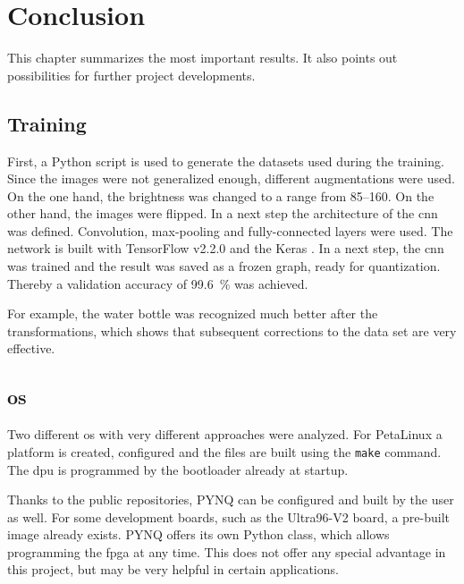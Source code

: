 \chapter{Conclusion}
\label{ch:conclusion}

This chapter summarizes the most important results.
It also points out possibilities for further project developments.

\section{Training}
\label{sec:conclusion:training}

First, a Python script is used to generate the datasets used during the training.
Since the images were not generalized enough, different augmentations were used.
On the one hand, the brightness was changed to a range from \numrange{85}{160}.
On the other hand, the images were flipped.
In a next step the architecture of the \acrshort{cnn} was defined.
Convolution, max-pooling and fully-connected layers were used.
The network is built with TensorFlow v2.2.0 and the Keras .
In a next step, the \acrshort{cnn} was trained and the result was saved as a frozen graph, ready for quantization.
Thereby a validation accuracy of \SI{99.6}{\percent} was achieved.

For example, the water bottle was recognized much better after the transformations, which shows that subsequent corrections to the data set are very effective.

\section{\Acrlong{os}}
\label{sec:conclusion:os}
Two different \acrshort{os} with very different approaches were analyzed.
For PetaLinux a platform is created, configured and the files are built using the \texttt{make} command.
The \acrshort{dpu} is programmed by the bootloader already at startup.

Thanks to the public repositories, PYNQ can be configured and built by the user as well.
For some development boards, such as the Ultra96-V2 board, a pre-built image already exists.
PYNQ offers its own Python class, which allows programming the \acrshort{fpga} at any time.
This does not offer any special advantage in this project, but may be very helpful in certain applications.

